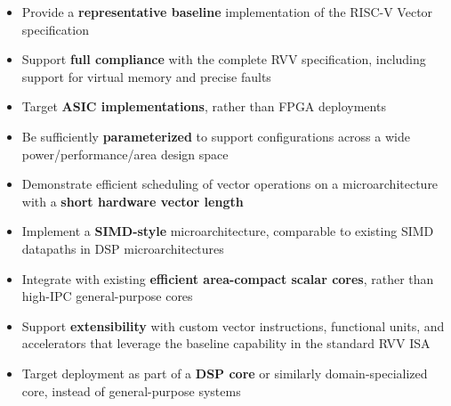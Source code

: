 \begin{itemize}
\item Provide a \textbf{representative baseline} implementation of the RISC-V Vector specification
\item Support \textbf{full compliance} with the complete RVV specification, including support for virtual memory and precise faults
\item Target \textbf{ASIC implementations}, rather than FPGA deployments
\item Be sufficiently \textbf{parameterized} to support configurations across a wide power/performance/area design space
\item Demonstrate efficient scheduling of vector operations on a microarchitecture with a \textbf{short hardware vector length}
\item Implement a \textbf{SIMD-style} microarchitecture, comparable to existing SIMD datapaths in DSP microarchitectures
\item Integrate with existing \textbf{efficient area-compact scalar cores}, rather than high-IPC general-purpose cores
\item Support \textbf{extensibility} with custom vector instructions, functional units, and accelerators that leverage the baseline capability in the standard RVV ISA
\item Target deployment as part of a \textbf{DSP core} or similarly domain-specialized core, instead of general-purpose systems
\end{itemize}
